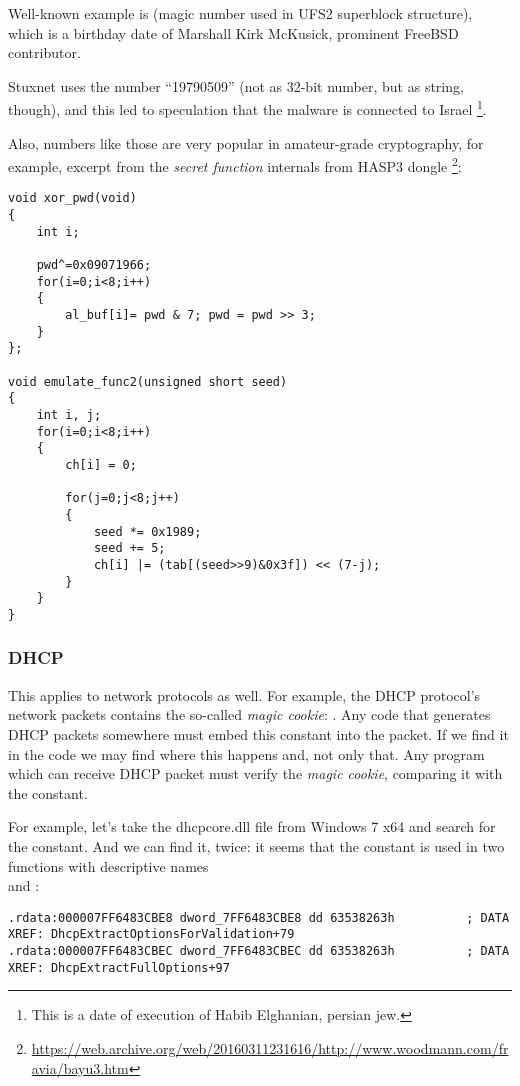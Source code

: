 Well-known example is  (magic number used in UFS2 superblock structure), which is a birthday date of Marshall Kirk McKusick, prominent FreeBSD contributor.

Stuxnet uses the number ``19790509'' (not as 32-bit number, but as string, though), and this led to speculation
that the malware is connected to Israel%
\footnote{This is a date of execution of Habib Elghanian, persian jew.}.

Also, numbers like those are very popular in amateur-grade cryptography, for example, excerpt from the \emph{secret function} internals from HASP3 dongle
\footnote{\url{https://web.archive.org/web/20160311231616/http://www.woodmann.com/fravia/bayu3.htm}}:

\begin{lstlisting}[style=customc]
void xor_pwd(void) 
{ 
	int i; 
	
	pwd^=0x09071966;
	for(i=0;i<8;i++) 
	{ 
		al_buf[i]= pwd & 7; pwd = pwd >> 3; 
	} 
};

void emulate_func2(unsigned short seed)
{ 
	int i, j; 
	for(i=0;i<8;i++) 
	{ 
		ch[i] = 0; 
		
		for(j=0;j<8;j++)
		{ 
			seed *= 0x1989; 
			seed += 5; 
			ch[i] |= (tab[(seed>>9)&0x3f]) << (7-j); 
		}
	} 
}
\end{lstlisting}

\subsubsection{DHCP}

This applies to network protocols as well.
For example, the DHCP protocol's network packets contains the so-called \emph{magic cookie}: .
Any code that generates DHCP packets somewhere must embed this constant into the packet.
If we find it in the code we may find where this happens and, not only that.
Any program which can receive DHCP packet must verify the \emph{magic cookie}, comparing it with the constant.

For example, let's take the dhcpcore.dll file from Windows 7 x64 and search for the constant.
And we can find it, twice:
it seems that the constant is used in two functions with descriptive names\\
 and :

\begin{lstlisting}[caption=dhcpcore.dll (Windows 7 x64),style=customasmx86]
.rdata:000007FF6483CBE8 dword_7FF6483CBE8 dd 63538263h          ; DATA XREF: DhcpExtractOptionsForValidation+79
.rdata:000007FF6483CBEC dword_7FF6483CBEC dd 63538263h          ; DATA XREF: DhcpExtractFullOptions+97
\end{lstlisting}

